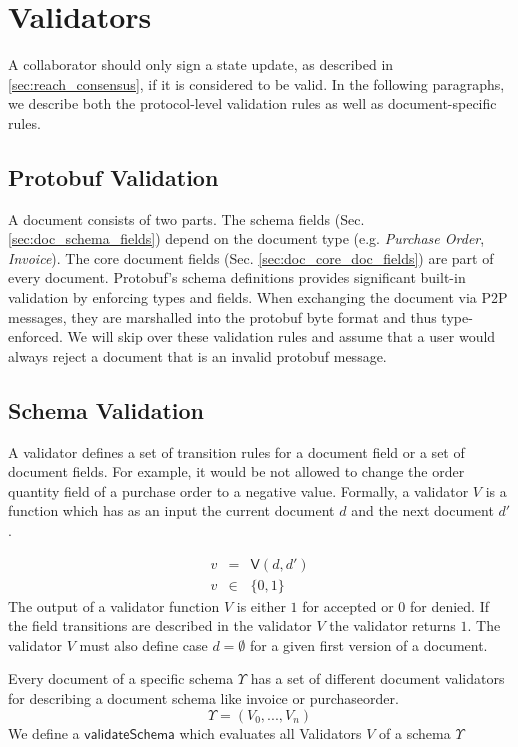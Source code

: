\section{Validators}
A collaborator should only sign a state update, as described in \ref{sec:reach_consensus}, if it is considered to be valid. In the following paragraphs, we describe both the protocol-level validation rules as well as document-specific rules.

\subsection{Protobuf Validation}
A document consists of two parts. The schema fields (Sec. \ref{sec:doc_schema_fields}) depend on the document type (e.g. \textit{Purchase Order}, \textit{Invoice}). The core document fields (Sec. \ref{sec:doc_core_doc_fields}) are part of every document. Protobuf's schema definitions provides significant built-in validation by enforcing types and fields. When exchanging the document via P2P messages, they are marshalled into the protobuf byte format and thus type-enforced. We will skip over these validation rules and assume that a user would always reject a document that is an invalid protobuf message.

\subsection{Schema Validation}
A validator defines a set of transition rules for a document field or a set of document fields. For example, it would be not allowed to change the order quantity field of a purchase order to a negative value. Formally, a validator $V$ is a function which has as an input the current document $d$ and the next document $d'$.

\begin{eqnarray}
v & = & \mathsf{V}(d, d') \\
 v &\in & \{0,1\}
\end{eqnarray}
The output of a validator function $V$ is either $1$ for accepted or $0$ for denied. If the field transitions are described in the validator $V$ the validator returns $1$.
The validator $V$ must also define case $d = \emptyset$ for a given first version of a document.

Every document of a specific schema $\Upsilon$  has a set of different document validators for describing a document schema like invoice or purchaseorder.
\begin{equation}
     \Upsilon = (V_0,...,V_n) 
\end{equation}
We define a $\mathsf{validateSchema}$ which evaluates all Validators $V$ of a schema $\Upsilon$

